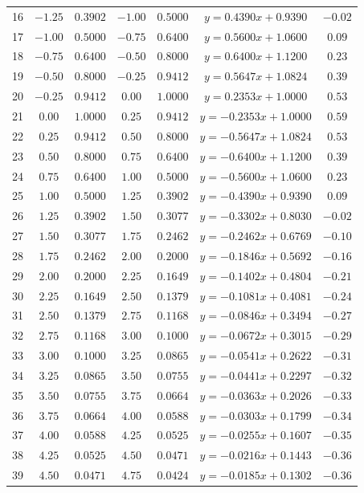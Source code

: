 \documentclass[12pt,a4paper]{report}
\begin{document}
\begin{table}
\begin{center}
\begin{tabular}{c | cc|cc|c|c}
			16 &$-1.25$&$0.3902$&$-1.00$&$0.5000$&$y =  0.4390x+0.9390$&$-0.02$\\
			17 &$-1.00$&$0.5000$&$-0.75$&$0.6400$&$y =  0.5600x+1.0600$&$0.09$\\
			18 &$-0.75$&$0.6400$&$-0.50$&$0.8000$&$y =  0.6400x+1.1200$&$0.23$\\
			19 &$-0.50$&$0.8000$&$-0.25$&$0.9412$&$y =  0.5647x+1.0824$&$0.39$\\
			20 &$-0.25$&$0.9412$&$0.00$&$1.0000$&$y =  0.2353x+1.0000$&$0.53$\\
			21 &$0.00$&$1.0000$&$0.25$&$0.9412$&$y = -0.2353x+1.0000$&$0.59$\\
			22 &$0.25$&$0.9412$&$0.50$&$0.8000$&$y = -0.5647x+1.0824$&$0.53$\\
			23 &$0.50$&$0.8000$&$0.75$&$0.6400$&$y = -0.6400x+1.1200$&$0.39$\\
			24 &$0.75$&$0.6400$&$1.00$&$0.5000$&$y = -0.5600x+1.0600$&$0.23$\\
			25 &$1.00$&$0.5000$&$1.25$&$0.3902$&$y = -0.4390x+0.9390$&$0.09$\\
			26 &$1.25$&$0.3902$&$1.50$&$0.3077$&$y = -0.3302x+0.8030$&$-0.02$\\
			27 &$1.50$&$0.3077$&$1.75$&$0.2462$&$y = -0.2462x+0.6769$&$-0.10$\\
			28 &$1.75$&$0.2462$&$2.00$&$0.2000$&$y = -0.1846x+0.5692$&$-0.16$\\
			29 &$2.00$&$0.2000$&$2.25$&$0.1649$&$y = -0.1402x+0.4804$&$-0.21$\\
			30 &$2.25$&$0.1649$&$2.50$&$0.1379$&$y = -0.1081x+0.4081$&$-0.24$\\
			31 &$2.50$&$0.1379$&$2.75$&$0.1168$&$y = -0.0846x+0.3494$&$-0.27$\\
			32 &$2.75$&$0.1168$&$3.00$&$0.1000$&$y = -0.0672x+0.3015$&$-0.29$\\
			33 &$3.00$&$0.1000$&$3.25$&$0.0865$&$y = -0.0541x+0.2622$&$-0.31$\\
			34 &$3.25$&$0.0865$&$3.50$&$0.0755$&$y = -0.0441x+0.2297$&$-0.32$\\
			35 &$3.50$&$0.0755$&$3.75$&$0.0664$&$y = -0.0363x+0.2026$&$-0.33$\\
			36 &$3.75$&$0.0664$&$4.00$&$0.0588$&$y = -0.0303x+0.1799$&$-0.34$\\
			37 &$4.00$&$0.0588$&$4.25$&$0.0525$&$y = -0.0255x+0.1607$&$-0.35$\\
			38 &$4.25$&$0.0525$&$4.50$&$0.0471$&$y = -0.0216x+0.1443$&$-0.36$\\
			39 &$4.50$&$0.0471$&$4.75$&$0.0424$&$y = -0.0185x+0.1302$&$-0.36$\\

\end{tabular}
\end{center}
\end{table}
\end{document}
